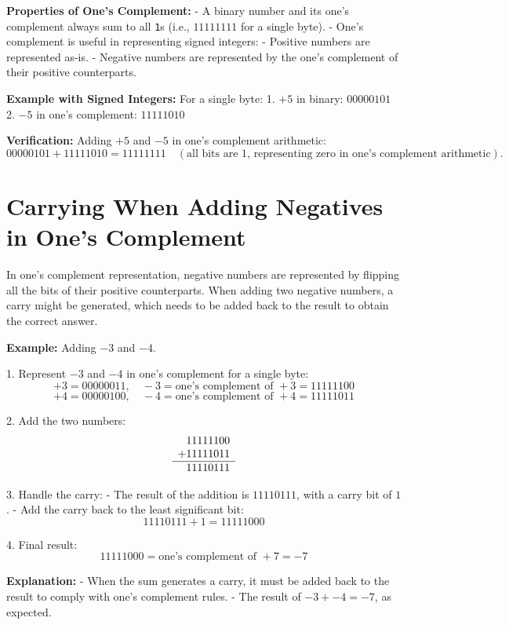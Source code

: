 \documentclass{report}
\begin{document}
\textbf{Properties of One's Complement:}
- A binary number and its one's complement always sum to all \texttt{1}s (i.e., \(11111111\) for a single byte).
- One's complement is useful in representing signed integers:
   - Positive numbers are represented as-is.
   - Negative numbers are represented by the one's complement of their positive counterparts.

\textbf{Example with Signed Integers:}
For a single byte:
1. \(+5\) in binary: \(00000101\)
2. \(-5\) in one's complement: \(11111010\)

\textbf{Verification:}
Adding \(+5\) and \(-5\) in one's complement arithmetic:
\[
00000101 + 11111010 = 11111111 \quad (\text{all bits are 1, representing zero in one's complement arithmetic}).
\]

\section{Carrying When Adding Negatives in One's Complement}

In one's complement representation, negative numbers are represented by flipping all the bits of their positive counterparts. When adding two negative numbers, a carry might be generated, which needs to be added back to the result to obtain the correct answer.

\textbf{Example:} Adding \(-3\) and \(-4\).

1. Represent \(-3\) and \(-4\) in one's complement for a single byte:
   \[
   +3 = 00000011, \quad -3 = \text{one's complement of } +3 = 11111100
   \]
   \[
   +4 = 00000100, \quad -4 = \text{one's complement of } +4 = 11111011
   \]

2. Add the two numbers:
   \[
   \begin{array}{c@{}c@{}c@{}c@{}c@{}c@{}c@{}c@{}c}
       & 1 & 1 & 1 & 1 & 1 & 1 & 0 & 0 \\ 
     + & 1 & 1 & 1 & 1 & 1 & 0 & 1 & 1 \\ \hline
       & 1 & 1 & 1 & 1 & 0 & 1 & 1 & 1 \\ 
   \end{array}
   \]

3. Handle the carry:
   - The result of the addition is \(11110111\), with a carry bit of \(1\).
   - Add the carry back to the least significant bit:
     \[
     11110111 + 1 = 11111000
     \]

4. Final result:
   \[
   11111000 = \text{one's complement of } +7 = -7
   \]

\textbf{Explanation:}
- When the sum generates a carry, it must be added back to the result to comply with one's complement rules.
- The result of \(-3 + -4 = -7\), as expected.
\end{document}
